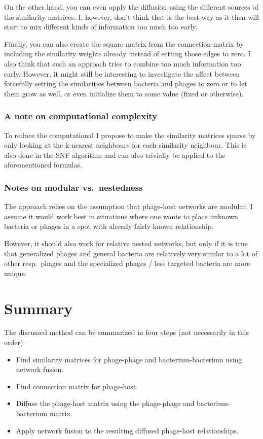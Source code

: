\documentclass{article}
\begin{document}
On the other hand, you can even apply the diffusion
using the different sources of the similarity matrices. I, however, don't
think that is the best way as it then will start to mix different kinds 
of information too much too early.

Finally, you can
also create the square matrix from the connection matrix by including the
similarity weights already instead of setting those edges to zero. I also 
think that such an approach tries to combine too much information too early.
However, it might still be interesting to investigate the affect between
forcefully setting the similarities between bacteria and phages to zero 
or to let them grow as well, or even initialize them to some value (fixed
or otherwise).

\subsubsection{A note on computational complexity}

To reduce the computational I propose to make the similarity matrices sparse by only
looking at the k-nearest neighbours for each similarity neighbour.
This is also done in the SNF algorithm and can also trivially be applied 
to the aforementioned formulas.

\subsubsection{Notes on modular vs.\ nestedness}

The approach relies on the assumption that phage-host networks are
modular. I assume it would work best in situations where one wants to place
unknown bacteria or phages in a spot with already fairly known relationship. 

However, it should also work for relative nested networks, but only if it is 
true that generalized phages and general bacteria are relatively very 
similar to a lot of other resp.\ phages and 
the specialized phages / less targeted bacteria are more unique. 

\section{Summary}

The discussed method can be summarized in four steps (not necessarily in this order):

\begin{itemize}
\item Find similarity matrices for phage-phage and bacterium-bacterium using network fusion.
\item Find connection matrix for phage-host.
\item Diffuse the phage-host matrix using the phage-phage and bacterium-bacterium matrix.
\item Apply network fusion to the resulting diffused phage-host relationships.
 \end{itemize}
\end{document}
